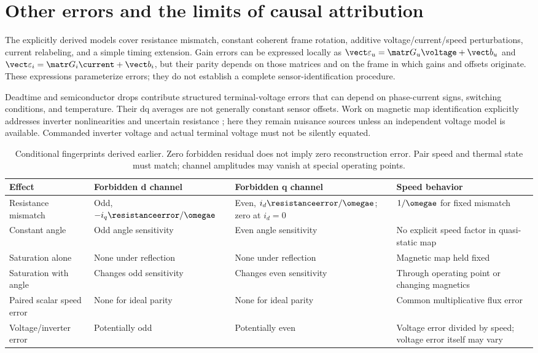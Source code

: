 \section{Other errors and the limits of causal attribution}
The explicitly derived models cover resistance mismatch, constant coherent
frame rotation, additive voltage/current/speed perturbations, current relabeling,
and a simple timing extension. Gain errors can be expressed locally as
$\vect\varepsilon_u=\matr G_u\voltage+\vect b_u$ and
$\vect\varepsilon_i=\matr G_i\current+\vect b_i$, but their parity depends
on those matrices and on the frame in which gains and offsets originate.
These expressions parameterize errors; they do not establish a complete
sensor-identification procedure.

Deadtime and semiconductor drops contribute structured terminal-voltage errors
that can depend on phase-current signs, switching conditions, and temperature.
Their dq averages are not generally constant sensor offsets. Work on magnetic
map identification explicitly addresses inverter nonlinearities and uncertain
resistance \cite{liu2018}; here they remain nuisance sources unless an
independent voltage model is available. Commanded inverter voltage and actual
terminal voltage must not be silently equated.

\begin{table}[tb]
\centering\small
\begin{tabularx}{\textwidth}{@{}lXXX@{}}
\toprule
Effect & Forbidden d channel & Forbidden q channel & Speed behavior\\
\midrule
Resistance mismatch & Odd, $-i_q\resistanceerror/\omegae$ & Even, $i_d\resistanceerror/\omegae$;
zero at $i_d=0$ & $1/\omegae$ for fixed mismatch\\
Constant angle & Odd angle sensitivity & Even angle sensitivity & No explicit
speed factor in quasi-static map\\
Saturation alone & None under reflection & None under reflection & Magnetic
map held fixed\\
Saturation with angle & Changes odd sensitivity & Changes even sensitivity &
Through operating point or changing magnetics\\
Paired scalar speed error & None for ideal parity & None for ideal parity &
Common multiplicative flux error\\
Voltage/inverter error & Potentially odd & Potentially even & Voltage error
divided by speed; voltage error itself may vary\\
\bottomrule
\end{tabularx}
\caption{Conditional fingerprints derived earlier. Zero forbidden residual
does not imply zero reconstruction error. Pair speed and thermal state must
match; channel amplitudes may vanish at special operating points.}
\label{tab:fingerprints}
\end{table}

